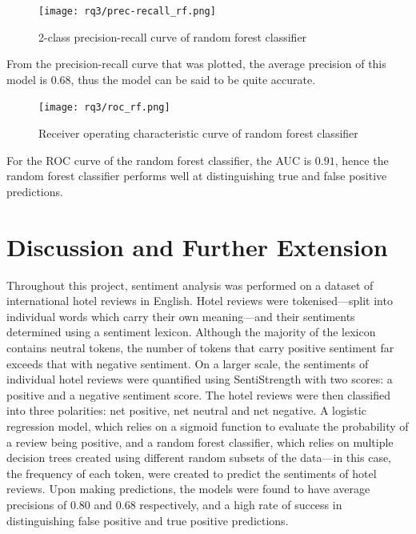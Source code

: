 \documentclass[12pt, bibliography=totocnumbered, paper=a4]{scrartcl}
\begin{document}
\begin{figure}[htpb]
	\begin{center}
		\texttt{[image: rq3/prec-recall\_rf.png]}
	\end{center}
	\caption{2-class precision-recall curve of random forest classifier}
	\label{fig:rf-prcurve}
\end{figure}

From the precision-recall curve that was plotted, the average precision
of this model is \(0.68\), thus the model can be said to be quite accurate.

\begin{figure}[htpb]
	\begin{center}
		\texttt{[image: rq3/roc\_rf.png]}
	\end{center}
	\caption{Receiver operating characteristic curve of random forest classifier}
	\label{fig:rf-roc}
\end{figure}

For the ROC curve of the random forest classifier, the AUC is \(0.91\), hence
the random forest classifier performs well at distinguishing true and false
positive predictions.

\section{Discussion and Further Extension}
Throughout this project, sentiment analysis was performed on a dataset of
international hotel reviews in English. Hotel reviews were tokenised---split
into individual words which carry their own meaning---and their sentiments
determined using a sentiment lexicon. Although the majority of the lexicon
contains neutral tokens, the number of tokens that carry positive sentiment
far exceeds that with negative sentiment. On a larger scale, the sentiments
of individual hotel reviews were quantified using SentiStrength with two scores:
a positive and a negative sentiment score. The hotel reviews were then classified
into three polarities: net positive, net neutral and net negative. A logistic
regression model, which relies on a sigmoid function to evaluate the probability
of a review being positive, and a random forest classifier, which relies on multiple
decision trees created using different random subsets of the data---in this case, the
frequency of each token, were created to predict the sentiments of hotel reviews. Upon
making predictions, the models were found to have average precisions of \(0.80\) and \(0.68\)
respectively, and a high rate of success in distinguishing false positive
and true positive predictions.
\end{document}
